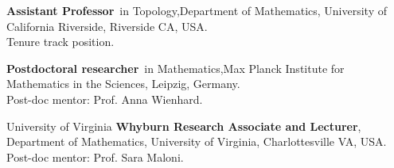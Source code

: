 
{\textbf{Assistant Professor}~in Topology,}{Department of Mathematics, University of California Riverside, Riverside CA, USA.\\ Tenure track position.}

{\textbf{Postdoctoral researcher}~in Mathematics,}{Max Planck Institute for Mathematics in the Sciences, Leipzig, Germany. \\ Post-doc mentor: Prof. Anna Wienhard.}

{University of Virginia}
{\textbf{Whyburn Research Associate and Lecturer},}
{Department of Mathematics, University of Virginia, Charlottesville VA, USA. \\
Post-doc mentor: Prof. Sara Maloni.}
